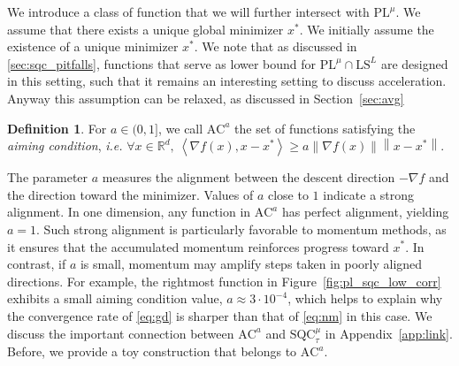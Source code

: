 \documentclass{article}
\def\R{{\mathbb{R}}}
\def\pl{{\text{PL}^\mu}}
\newcommand{\norm}[1]{\left\lVert#1\right\rVert}
\newcommand{\dotprod}[1]{\left< #1\right>}
\newcommand{\sqc}{\text{SQC}_{\tau}^{\mu}}
\newcommand{\ls}{\text{LS}^{L}}
\newcommand{\ac}{\text{AC}^{a}}
\newcommand{\sqcf}[2]{\text{SQC}_{#1}^{#2}}
\theoremstyle{plain}
\newtheorem{theorem}{Theorem}[section]
\theoremstyle{definition}
\newtheorem{definition}[theorem]{Definition}
\theoremstyle{remark}
\begin{document}
We introduce a class of function that we will further intersect with $\pl$.
We assume that there exists a unique global minimizer $x^\ast$.
We initially assume the existence
of a unique minimizer $x^\ast$. We note that as discussed in \cref{sec:sqc_pitfalls}, functions that serve as lower bound for $\pl \cap \ls$ are designed in this setting, such that it remains an interesting setting to discuss acceleration. Anyway this assumption can be relaxed, as discussed in
Section~\ref{sec:avg} 
\begin{definition}\label{def:ac}
    For $a\in(0,1]$, we call $\ac$ the set of functions satisfying the \textit{aiming condition},\textit{ i.e.} $\forall x\in \R^d,~ \dotprod{\nabla f(x),x-x^\ast} \ge a \norm{\nabla f(x)}\norm{x-x^\ast}$.
\end{definition}


The parameter $a$ measures the alignment between the descent direction $-\nabla f$ and the
direction toward the minimizer. Values of $a$ close to $1$ indicate a strong alignment. In one dimension, any function in $\ac$ has perfect alignment, yielding $a=1$.
Such strong alignment  is particularly favorable to momentum methods, as it ensures that
the accumulated momentum reinforces progress toward $x^\ast$.
In contrast, if $a$ is small, momentum may amplify steps taken in poorly aligned directions.
For example, the rightmost function in Figure~\ref{fig:pl_sqc_low_corr} exhibits
a small aiming condition value, $a \approx 3\cdot10^{-4}$, which helps to explain why the convergence rate of
\eqref{eq:gd} is sharper than that of \eqref{eq:nm} in this case.  We discuss the important connection between $\ac$ and $\sqc$ in Appendix~\ref{app:link}. Before, we provide a toy construction that belongs to $\ac$.
\end{document}
